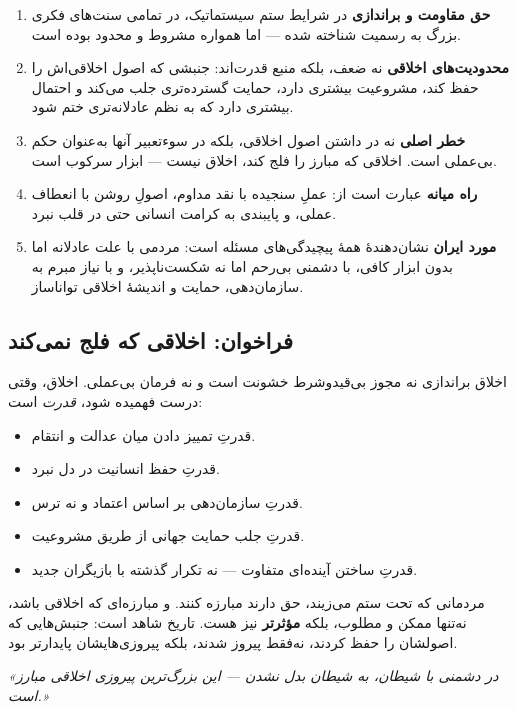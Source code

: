 \begin{enumerate}[label=\textbf{\arabic*.}]
\item \textbf{حق مقاومت و براندازی} در شرایط ستم سیستماتیک، در تمامی 
سنت‌های فکری بزرگ به رسمیت شناخته شده — اما همواره مشروط و محدود بوده 
است.

\item \textbf{محدودیت‌های اخلاقی} نه ضعف، بلکه منبع قدرت‌اند: جنبشی که 
اصول اخلاقی‌اش را حفظ کند، مشروعیت بیشتری دارد، حمایت گسترده‌تری جلب 
می‌کند و احتمال بیشتری دارد که به نظم عادلانه‌تری ختم شود.

\item \textbf{خطر اصلی} نه در داشتن اصول اخلاقی، بلکه در سوءتعبیر آنها 
به‌عنوان حکم بی‌عملی است. اخلاقی که مبارز را فلج کند، اخلاق نیست — 
ابزار سرکوب است.

\item \textbf{راه میانه} عبارت است از: عملِ سنجیده با نقد مداوم، اصولِ 
روشن با انعطاف عملی، و پایبندی به کرامت انسانی حتی در قلب نبرد.

\item \textbf{مورد ایران} نشان‌دهندهٔ همهٔ پیچیدگی‌های مسئله است: 
مردمی با علت عادلانه اما بدون ابزار کافی، با دشمنی بی‌رحم اما نه 
شکست‌ناپذیر، و با نیاز مبرم به سازمان‌دهی، حمایت و اندیشهٔ اخلاقی 
تواناساز.
\end{enumerate}

\subsection{فراخوان: اخلاقی که فلج نمی‌کند}

\begin{tcolorbox}[mybox, title={\textbf{بیانیهٔ پایانی: اخلاق به‌مثابه 
قدرت}}]
اخلاق براندازی نه مجوز بی‌قیدوشرط خشونت است و نه فرمان بی‌عملی. 
اخلاق، وقتی درست فهمیده شود، \textit{قدرت} است:

\begin{itemize}
\item قدرتِ تمییز دادن میان عدالت و انتقام.
\item قدرتِ حفظ انسانیت در دل نبرد.
\item قدرتِ سازمان‌دهی بر اساس اعتماد و نه ترس.
\item قدرتِ جلب حمایت جهانی از طریق مشروعیت.
\item قدرتِ ساختن آینده‌ای متفاوت — نه تکرار گذشته با بازیگران جدید.
\end{itemize}

مردمانی که تحت ستم می‌زیند، حق دارند مبارزه کنند. و مبارزه‌ای که 
اخلاقی باشد، نه‌تنها ممکن و مطلوب، بلکه \textbf{مؤثرتر} نیز هست. 
تاریخ شاهد است: جنبش‌هایی که اصولشان را حفظ کردند، نه‌فقط پیروز شدند، 
بلکه پیروزی‌هایشان پایدارتر بود.

\vspace{8pt}
\begin{center}
\textit{«در دشمنی با شیطان، به شیطان بدل نشدن — این بزرگ‌ترین پیروزی 
اخلاقی مبارز است.»}
\end{center}
\end{tcolorbox}


